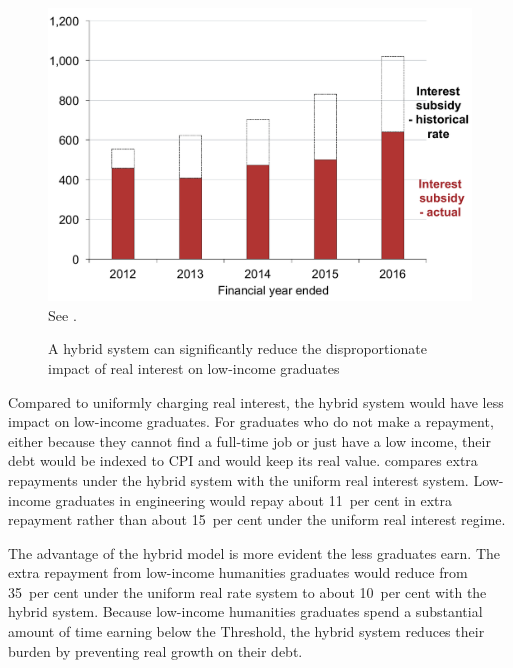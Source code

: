 \documentclass[embargoed]{grattan}
\begin{document}
\begin{figure}
\caption{A hybrid system can significantly reduce the disproportionate impact of real interest on low-income graduates}\label{fig:fig17-a-hybrid-system-can-signif-reduce-disprop-impact-of-real-interest-low-income-grads}


\includegraphics[page=17]{atlas/Chartpack.pdf}
{See .}
\end{figure}

Compared to uniformly charging real interest, the hybrid system would have less impact on low-income graduates.
For graduates who do not make a repayment, either because they cannot find a full-time job or just have a low income, their debt would be indexed to \gls{CPI} and would keep its real value.
 compares extra repayments under the hybrid system with the uniform real interest system.
Low-income graduates in engineering would repay about 11~per cent in extra repayment rather than about 15~per cent under the uniform real interest regime.

The advantage of the hybrid model is more evident the less graduates earn.
The extra repayment from low-income humanities graduates would reduce from 35~per cent under the uniform real rate system to about 10~per cent with the hybrid system.
Because low-income humanities graduates spend a substantial amount of time earning below the \gls{Threshold}, the hybrid system reduces their burden by preventing real growth on their debt.
\end{document}
